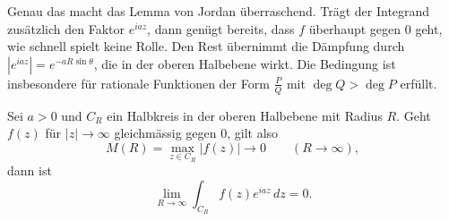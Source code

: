 Genau das macht das Lemma von Jordan überraschend.
Trägt der Integrand zusätzlich den Faktor $e^{iaz}$, dann genügt bereits,
dass $f$ überhaupt gegen $0$ geht, wie schnell spielt keine Rolle.
Den Rest übernimmt die Dämpfung durch $|e^{iaz}| = e^{-aR\sin\theta}$, die in
der oberen Halbebene wirkt.
Die Bedingung ist insbesondere für rationale Funktionen der Form
$\frac{P}{Q}$ mit $\deg Q > \deg P$ erfüllt.

\begin{lemma}[Jordan]
\label{hauptwert:lemma:jordan}
%
Sei $a > 0$ und $C_R$ ein Halbkreis in der oberen Halbebene mit Radius $R$.
Geht $f(z)$ für $|z| \to \infty$ gleichmässig gegen $0$, gilt also
\begin{equation}
  M(R) = \max_{z \in C_R} |f(z)| \to 0
  \qquad (R \to \infty),
  \label{hauptwert:equation:jordanbedingung}
\end{equation}
dann ist
\begin{equation}
  \lim_{R \to \infty} \int_{C_R} f(z) e^{i a z}\,dz = 0.
\end{equation}
\end{lemma}

